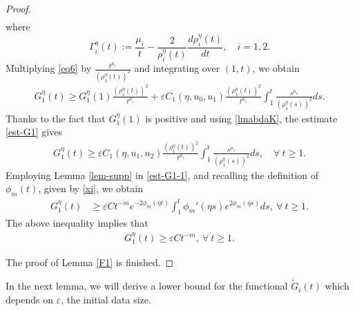 \documentclass[12pt,leqno]{amsart}
\numberwithin{equation}{section}
\theoremstyle{remark}
\newcommand{\ep}{\varepsilon}
\def\d{\displaystyle}
\def\e{{\varepsilon}}
\begin{document}
\begin{proof}
\begin{equation}
\begin{array}{l}
\end{array}
\end{equation}
where 
\begin{equation}\label{gamma}
\d \Gamma_i^{\eta}(t):=\frac{\mu_i}{t}- \frac{2}{\rho^{\eta}_i(t)}\frac{d\rho^{\eta}_i(t)}{dt}, \quad i=1,2.
\end{equation}
Multiplying  \eqref{eq6} by $\d \frac{t^{\mu_1}}{(\rho^{\eta}_1(t))^2}$ and integrating over $(1,t)$, we obtain
\begin{align}\label{est-G1}
 G^{\eta}_1(t)
\ge G^{\eta}_1(1)\frac{(\rho^{\eta}_1(t))^2}{t^{\mu_1}}+{\e}C_1(\eta, u_0,u_1)\frac{(\rho^{\eta}_1(t))^2}{t^{\mu_1}}\int_1^t\frac{s^{\mu_1}}{(\rho^{\eta}_1(s))^2}ds.
\end{align}
Thanks to the fact that $G^{\eta}_1(1)$ is positive and using \eqref{lmabdaK},  the estimate \eqref{est-G1} gives
\begin{align}\label{est-G1-1}
 G^{\eta}_1(t)
\ge {\e}C_1(\eta, u_1,u_2)\frac{(\rho^{\eta}_1(t))^2}{t^{\mu_1}}\int_{1}^t\frac{s^{\mu_1}}{(\rho^{\eta}_1(s))^2}ds, \quad \forall \ t \ge 1.
\end{align}
Employing Lemma \ref{lem-supp} in \eqref{est-G1-1}, and recalling the definition of $\phi_{m}(t)$, given by \eqref{xi},   we obtain
\begin{align}\label{est-U-2}
 G^{\eta}_1(t)
&\ge \e C t^{-m}e^{-2\phi_{m}(\eta t)}\int^t_{1}\phi_{m}'(\eta s)e^{2\phi_{m}(\eta s)}ds, \ \forall \ t \ge 1.
\end{align}
The above inequality implies that
\begin{align}\label{est-G1-3}
 G^{\eta}_1(t)
\ge \e  C t^{-m}, \ \forall \ t \ge 1.
\end{align}





The proof of Lemma \ref{F1} is finished.
\end{proof}







In the next lemma, we will derive a lower bound for the functional $\tilde{G}_i(t)$ which depends on $\ep$, the initial data size. 
\end{document}
